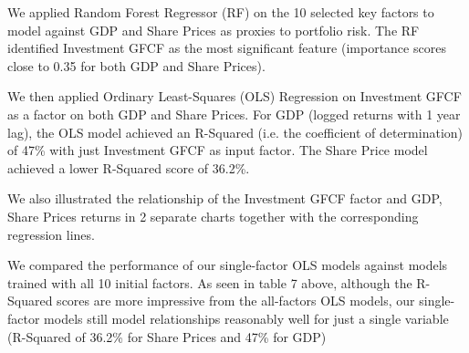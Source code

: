 \documentclass{elsarticle}
\begin{document}
We applied Random Forest Regressor (RF) on the 10 selected key factors to model against GDP and Share Prices as proxies to portfolio risk. The RF identified Investment GFCF as the most significant feature (importance scores close to 0.35 for both GDP and Share Prices).

We then applied Ordinary Least-Squares (OLS) Regression on Investment GFCF as a factor on both GDP and Share Prices. For GDP (logged returns with 1 year lag), the OLS model achieved an R-Squared (i.e. the coefficient of determination) of 47\% with just Investment GFCF as input factor. The Share Price model achieved a lower R-Squared score of 36.2\%.

We also illustrated the relationship of the Investment GFCF factor and GDP, Share Prices returns in 2 separate charts together with the corresponding regression lines. 

We compared the performance of our single-factor OLS models against models trained with all 10 initial factors. As seen in table 7 above, although the R-Squared scores are more impressive from the all-factors OLS models, our single-factor models still model relationships reasonably well for just a single variable (R-Squared of 36.2\% for Share Prices and 47\% for GDP)

\printbibliography
\end{document}

